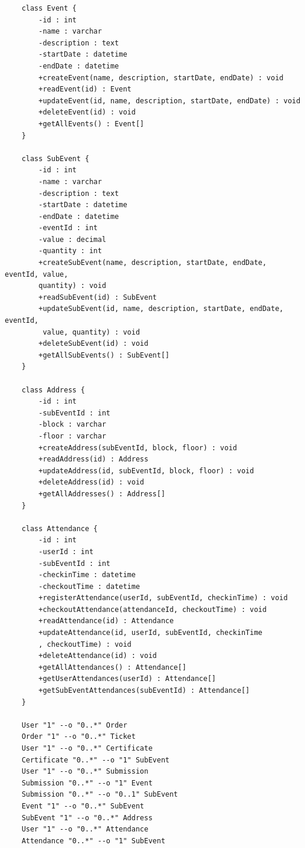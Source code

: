 \begin{verbatim}
    class Event {
        -id : int
        -name : varchar
        -description : text
        -startDate : datetime
        -endDate : datetime
        +createEvent(name, description, startDate, endDate) : void
        +readEvent(id) : Event
        +updateEvent(id, name, description, startDate, endDate) : void
        +deleteEvent(id) : void
        +getAllEvents() : Event[]
    }

    class SubEvent {
        -id : int
        -name : varchar
        -description : text
        -startDate : datetime
        -endDate : datetime
        -eventId : int
        -value : decimal
        -quantity : int
        +createSubEvent(name, description, startDate, endDate, eventId, value, 
        quantity) : void
        +readSubEvent(id) : SubEvent
        +updateSubEvent(id, name, description, startDate, endDate, eventId,
         value, quantity) : void
        +deleteSubEvent(id) : void
        +getAllSubEvents() : SubEvent[]
    }

    class Address {
        -id : int
        -subEventId : int
        -block : varchar
        -floor : varchar
        +createAddress(subEventId, block, floor) : void
        +readAddress(id) : Address
        +updateAddress(id, subEventId, block, floor) : void
        +deleteAddress(id) : void
        +getAllAddresses() : Address[]
    }

    class Attendance {
        -id : int
        -userId : int
        -subEventId : int
        -checkinTime : datetime
        -checkoutTime : datetime
        +registerAttendance(userId, subEventId, checkinTime) : void
        +checkoutAttendance(attendanceId, checkoutTime) : void
        +readAttendance(id) : Attendance
        +updateAttendance(id, userId, subEventId, checkinTime
        , checkoutTime) : void
        +deleteAttendance(id) : void
        +getAllAttendances() : Attendance[]
        +getUserAttendances(userId) : Attendance[]
        +getSubEventAttendances(subEventId) : Attendance[]
    }

    User "1" --o "0..*" Order
    Order "1" --o "0..*" Ticket
    User "1" --o "0..*" Certificate
    Certificate "0..*" --o "1" SubEvent
    User "1" --o "0..*" Submission
    Submission "0..*" --o "1" Event
    Submission "0..*" --o "0..1" SubEvent
    Event "1" --o "0..*" SubEvent
    SubEvent "1" --o "0..*" Address
    User "1" --o "0..*" Attendance
    Attendance "0..*" --o "1" SubEvent
\end{verbatim}
